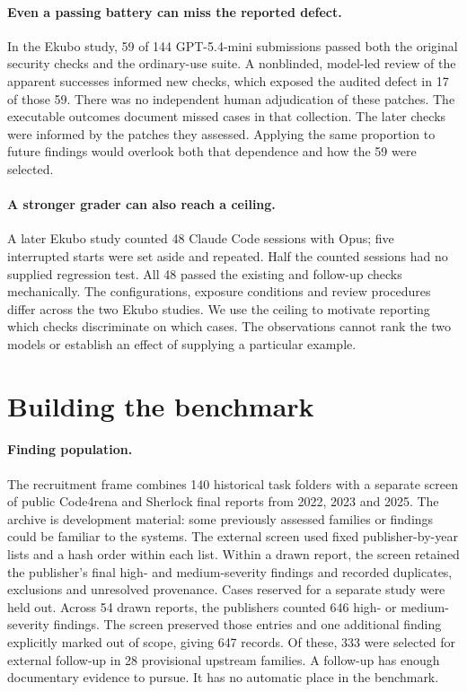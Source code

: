 \paragraph{Even a passing battery can miss the reported defect.}
In the Ekubo study, 59 of 144 GPT-5.4-mini submissions passed both the original security checks and the ordinary-use suite. A nonblinded, model-led review of the apparent successes informed new checks, which exposed the audited defect in 17 of those 59. There was no independent human adjudication of these patches. The executable outcomes document missed cases in that collection. The later checks were informed by the patches they assessed. Applying the same proportion to future findings would overlook both that dependence and how the 59 were selected.

\paragraph{A stronger grader can also reach a ceiling.}
A later Ekubo study counted 48 Claude Code sessions with Opus; five interrupted starts were set aside and repeated. Half the counted sessions had no supplied regression test. All 48 passed the existing and follow-up checks mechanically. The configurations, exposure conditions and review procedures differ across the two Ekubo studies. We use the ceiling to motivate reporting which checks discriminate on which cases. The observations cannot rank the two models or establish an effect of supplying a particular example.

\section{Building the benchmark}
\label{sec:construction}
\paragraph{Finding population.}
The recruitment frame combines 140 historical task folders with a separate screen of public Code4rena and Sherlock final reports from 2022, 2023 and 2025. The archive is development material: some previously assessed families or findings could be familiar to the systems. The external screen used fixed publisher-by-year lists and a hash order within each list. Within a drawn report, the screen retained the publisher's final high- and medium-severity findings and recorded duplicates, exclusions and unresolved provenance. Cases reserved for a separate study were held out. Across 54 drawn reports, the publishers counted 646 high- or medium-severity findings. The screen preserved those entries and one additional finding explicitly marked out of scope, giving 647 records. Of these, 333 were selected for external follow-up in 28 provisional upstream families. A follow-up has enough documentary evidence to pursue. It has no automatic place in the benchmark.

